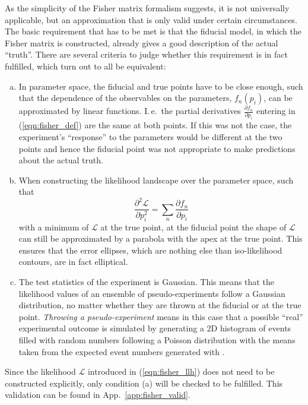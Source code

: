 As the simplicity of the Fisher matrix formalism suggests, it is not
universally applicable, but an approximation that is only valid under certain
circumstances. The basic requirement that has to be met is that the fiducial
model, in which the Fisher matrix is constructed, already gives a good
description of the actual ``truth''. There are several criteria to judge
whether this requirement is in fact fulfilled, which turn out to all be
equivalent:
\begin{enumerate}[(a)]
 \item In parameter space, the fiducial and true points have to be close
  enough, such that the dependence of the observables on the parameters,
  $f_n(p_i)$, can be approximated by linear functions. I.\,e.\ the partial
  derivatives $\frac{\partial f_n}{\partial p_i}$ entering in
  (\ref{eqn:fisher_def}) are the same at both points. If this was not the case,
  the experiment's ``response'' to the parameters would be different at the two
  points and hence the fiducial point was not appropriate to make predictions
  about the actual truth.
 \item When constructing the likelihood landscape over the parameter space, such
  that
  \begin{equation}
   \frac{\partial^2\mathcal{L}}{\partial p_i^2}
     = \sum_n \frac{\partial f_n}{\partial p_i}
   \label{eqn:fisher_llh}
  \end{equation}
  with a minimum of $\mathcal{L}$ at the true point, at the fiducial point the
  shape of $\mathcal{L}$ can still be approximated by a parabola with the apex
  at the true point. This ensures that the error ellipses, which are nothing
  else than iso-likelihood contours, are in fact elliptical.
 \item The test statistics of the experiment is Gaussian. This means that the
  likelihood values of an ensemble of pseudo-experiments follow a Gaussian
  distribution, no matter whether they are thrown at the fiducial or at the true
  point. \emph{Throwing a pseudo-experiment} means in this case that
  a possible ``real'' experimental outcome is simulated by generating a 2D
  histogram of events filled with random numbers following a Poisson
  distribution with the means taken from the expected event numbers generated
  with \papa.
\end{enumerate}
Since the likelihood $\mathcal{L}$ introduced in (\ref{eqn:fisher_llh}) does
not need to be constructed explicitly, only condition (a) will be checked to
be fulfilled. This validation can be found in App.~\ref{app:fisher_valid}.

